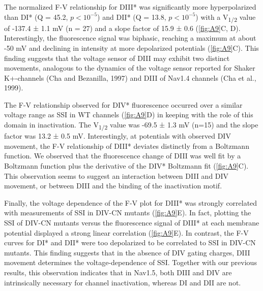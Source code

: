 The normalized F-V relationship for DIII* was significantly more hyperpolarized than DI* (Q = 45.2, $p < 10^{-5}$) and DII* (Q = 13.8, $p < 10^{-5}$) with a V\textsubscript{1/2} value of -137.4 ± 1.1 mV (n = 27) and a slope factor of 15.9 ± 0.6 (\autoref{fig:A9}C, D). Interestingly, the fluorescence signal was biphasic, reaching a maximum at about -50 mV and declining in intensity at more depolarized potentials (\autoref{fig:A9}C). This finding suggests that the voltage sensor of DIII may exhibit two distinct movements, analogous to the dynamics of the voltage sensor reported for Shaker K+-channels (Cha and Bezanilla, 1997) and DIII of Nav1.4 channels (Cha et al., 1999).

The F-V relationship observed for DIV* fluorescence occurred over a similar voltage range as SSI in WT channels (\autoref{fig:A9}D) in keeping with the role of this domain in inactivation. The V\textsubscript{1/2} value was -69.5 ± 1.3 mV (n=15) and the slope factor was 13.2 ± 0.5 mV. Interestingly, at potentials with observed DIV movement, the F-V relationship of DIII* deviates distinctly from a Boltzmann function. We observed that the fluorescence change of DIII was well fit by a Boltzmann function plus the derivative of the DIV* Boltzmann fit (\autoref{fig:A9}C). This observation seems to suggest an interaction between DIII and DIV movement, or between DIII and the binding of the inactivation motif. 

Finally, the voltage dependence of the F-V plot for DIII* was strongly correlated with measurements of SSI in DIV-CN mutants (\autoref{fig:A9}E). In fact, plotting the SSI of DIV-CN mutants versus the fluorescence signal of DIII* at each membrane potential displayed a strong linear correlation (\autoref{fig:A9}E). In contrast, the F-V curves for DI* and DII* were too depolarized to be correlated to SSI in DIV-CN mutants. This finding suggests that in the absence of DIV gating charges, DIII movement determines the voltage-dependence of SSI. Together with our previous results, this observation indicates that in Nav1.5, both DIII and DIV are intrinsically necessary for channel inactivation, whereas DI and DII are not.

